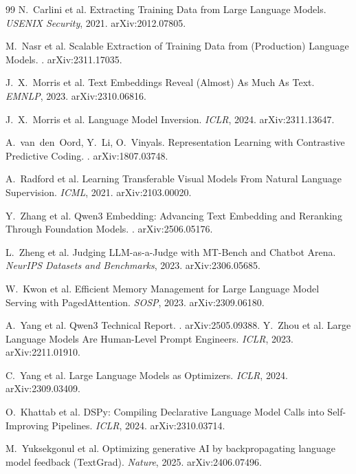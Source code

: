 \documentclass[11pt]{article}
\begin{document}
\begin{thebibliography}{99}
 N.~Carlini et al.
\newblock Extracting Training Data from Large Language Models.
\newblock \emph{USENIX Security}, 2021. arXiv:2012.07805.

 M.~Nasr et al.
\newblock Scalable Extraction of Training Data from (Production) Language Models.
. arXiv:2311.17035.

 J.~X.~Morris et al.
\newblock Text Embeddings Reveal (Almost) As Much As Text.
\newblock \emph{EMNLP}, 2023. arXiv:2310.06816.

 J.~X.~Morris et al.
\newblock Language Model Inversion.
\newblock \emph{ICLR}, 2024. arXiv:2311.13647.

 A.~van~den~Oord, Y.~Li, O.~Vinyals.
\newblock Representation Learning with Contrastive Predictive Coding.
. arXiv:1807.03748.

 A.~Radford et al.
\newblock Learning Transferable Visual Models From Natural Language Supervision.
\newblock \emph{ICML}, 2021. arXiv:2103.00020.

 Y.~Zhang et al.
\newblock Qwen3 Embedding: Advancing Text Embedding and Reranking Through Foundation Models.
. arXiv:2506.05176.

 L.~Zheng et al.
\newblock Judging LLM-as-a-Judge with MT-Bench and Chatbot Arena.
\newblock \emph{NeurIPS Datasets and Benchmarks}, 2023. arXiv:2306.05685.

 W.~Kwon et al.
\newblock Efficient Memory Management for Large Language Model Serving with PagedAttention.
\newblock \emph{SOSP}, 2023. arXiv:2309.06180.

 A.~Yang et al.
\newblock Qwen3 Technical Report.
. arXiv:2505.09388.
 Y.~Zhou et al.
\newblock Large Language Models Are Human-Level Prompt Engineers.
\newblock \emph{ICLR}, 2023. arXiv:2211.01910.

 C.~Yang et al.
\newblock Large Language Models as Optimizers.
\newblock \emph{ICLR}, 2024. arXiv:2309.03409.

 O.~Khattab et al.
\newblock DSPy: Compiling Declarative Language Model Calls into Self-Improving Pipelines.
\newblock \emph{ICLR}, 2024. arXiv:2310.03714.

 M.~Yuksekgonul et al.
\newblock Optimizing generative AI by backpropagating language model feedback (TextGrad).
\newblock \emph{Nature}, 2025. arXiv:2406.07496.


\end{thebibliography}
\end{document}
